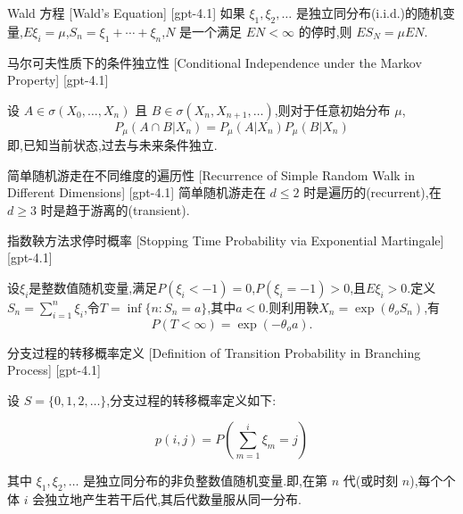 \documentclass[UTF8]{ctexart}
\begin{document}
    
    
    \begin{thm}
        {Wald 方程}
        [Wald's Equation]
        [gpt-4.1]
        如果 $\xi_{1}, \xi_{2}, \ldots$ 是独立同分布(i.i.d.)的随机变量,$E \xi_{i} = \mu$,$S_{n} = \xi_{1} + \cdots + \xi_{n}$,$N$ 是一个满足 $E N < \infty$ 的停时,则 $E S_{N} = \mu E N$.
    \end{thm}
    
    
    
    \begin{thm}
        {马尔可夫性质下的条件独立性}
        [Conditional Independence under the Markov Property]
        [gpt-4.1]
        
设 $A \in \sigma ( X _ { 0 } , \ldots , X _ { n } )$ 且 $B \in \sigma ( X _ { n } , X _ { n + 1 } , \ldots )$,则对于任意初始分布 $\mu$,
\[
P _ { \mu } ( A \cap B | X _ { n } ) = P _ { \mu } ( A | X _ { n } ) P _ { \mu } ( B | X _ { n } )
\]
即,已知当前状态,过去与未来条件独立.

    \end{thm}
    
    
    
    \begin{thm}
        {简单随机游走在不同维度的遍历性}
        [Recurrence of Simple Random Walk in Different Dimensions]
        [gpt-4.1]
        简单随机游走在 $d \leq 2$ 时是遍历的(recurrent),在 $d \geq 3$ 时是趋于游离的(transient).
    \end{thm}
    
    
    
    \begin{thm}
        {指数鞅方法求停时概率}
        [Stopping Time Probability via Exponential Martingale]
        [gpt-4.1]
        
设$\xi_{i}$是整数值随机变量,满足$P(\xi_{i} < -1) = 0$,$P(\xi_{i} = -1) > 0$,且$E \xi_{i} > 0$.定义$S_n = \sum_{i=1}^n \xi_i$,令$T = \operatorname*{inf}\{n : S_{n} = a\}$,其中$a < 0$.则利用鞅$X_{n} = \exp(\theta_{o} S_{n})$,有
\[
P(T < \infty) = \exp(-\theta_{o} a).
\]

    \end{thm}
    
    
    
    \begin{dfn}
        {分支过程的转移概率定义}
        [Definition of Transition Probability in Branching Process]
        [gpt-4.1]
        
设 $S = \{ 0 , 1 , 2 , \ldots \}$,分支过程的转移概率定义如下:

\[
p ( i , j ) = P \left( \sum _ { m = 1 } ^ { i } \xi _ { m } = j \right)
\]

其中 $\xi _ { 1 } , \xi _ { 2 } , \ldots$ 是独立同分布的非负整数值随机变量.即,在第 $n$ 代(或时刻 $n$),每个个体 $i$ 会独立地产生若干后代,其后代数量服从同一分布.

    \end{dfn}
    
\end{document}
